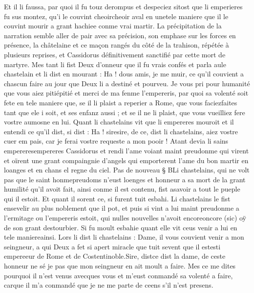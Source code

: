 \documentclass{article}
\begin{document}
\begin{pages}
   Et il li faussa, par quoi il fu touz derompus et despeciez sitost que 
      li emperieres fu sus montez, qu’i le couvint 
   cheoircheoir aval en 
   unetele maniere que il le couvint mourir a grant hachiee conme vrai martir.
   La précipitation de la narration semble aller de pair avec sa précision, son emphase sur les forces en présence,
   la châtelaine et ce maçon rangés du côté de la trahison, répétée à plusieurs reprises, et Cassidorus définitivement sanctifié par cette 
   mort de martyre.
   Mes tant li fist Deux d’onneur que il fu vrais confés et parla aule 
   chastelain et li dist en mourant :
   Ha ! dous amis, je me muir, ce qu’il couvient a chascun faire au jour que Deux li a 
      destiné et pourveu. Je vous pri pour humanité que vous aiez 
      pitiépitié et merci de 
      ma fenme l’empereris, par quoi sa volenté soit fete en tele maniere que, se il li plaist a 
      reperier a Rome, que vous faciezfaites 
      tant que ele i soit, et ses enfanz aussi ; et se il ne li plaist, que vous vueilliez fere vostre aumosne en lui. \pend
\pstart Quant li chastelains vit que 
   li empereres mouroit 
   et il entendi ce qu’il dist, si dist :
   Ha ! siresire, de ce, 
      dist li chastelains, 
      aiez vostre cuer em pais, car je ferai vostre requeste a mon pooir !
   Atant devia li sains 
      empereresempereres Cassidorus et 
   rendi l’ame voiant maint preudonme qui virent et oïrent une grant compaingnie 
   d’angels qui emporterent l’ame du bon martir en loanges et en chans el regne du ciel. \pend
\pstart Pas de nouveau § BLi chastelains, 
   qui ne volt pas que le saint honmepreudoms 
   n’eust loenges et honneur a sa mort de la grant humilité qu’il avoit fait, 
   ainsi conme il est contenu, fist asavoir a tout 
   le pueple qui il estoit. Et quant il sorent ce, 
   si furent tuit esbahi. Li chastelains le fist ensevelir au plus noblement que il pot, 
   et puis si vint a lui maint preudonme a l’ermitage ou l’empereris 
   estoit, qui nulles nouvelles n’avoit encoreoncore (sic) 
   oÿ de son grant destourbier. Si fu moult esbahie quant elle vit ceus venir a lui 
   en tele maniereainsi. 
   Lors li dist li chastelains :
   Dame, il vous couvient venir a mon seingneur, 
      a qui Deux a fet si apert miracle que tuit sevent que il 
      estesti
   empereeur de Rome et de Costentinoble.Sire, distce dist 
      la dame, de ceste honneur ne sé je pas que
      mon seingneur en ait moult a faire. Mes ce me dites pourquoi il n’est venus avecques vous 
      et m’eust conmandé sa volenté a faire, carque il m’a conmandé que 
      je ne me parte de ceens s’il n’est presens.

\end{pages}
\end{document}
